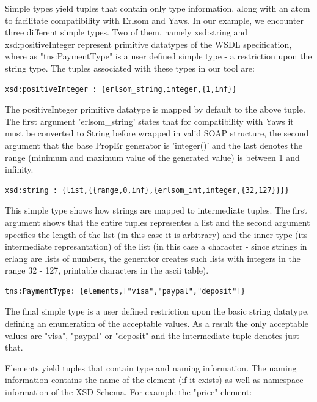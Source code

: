 \documentclass[submission,copyright,a4]{eptcs}
\begin{document}
Simple types yield tuples that contain only type information, along with an atom to facilitate compatibility with Erlsom and Yaws. In our example, we encounter three different simple types. Two of them, namely xsd:string and xsd:positiveInteger represent primitive datatypes of the WSDL specification, where as "tns:PaymentType" is a user defined simple type - a restriction upon the string type. The tuples associated with these types in our tool are:

\begin{lstlisting}
xsd:positiveInteger : {erlsom_string,integer,{1,inf}}
\end{lstlisting}

The positiveInteger primitive datatype is mapped by default to the above tuple. The first argument 'erlsom\_string' states that for compatibility with Yaws it must be converted to String before wrapped in valid SOAP structure, the second argument that the base PropEr generator is 'integer()' and the last denotes the range (minimum and maximum value of the generated value) is between 1 and infinity. 

\begin{lstlisting}
xsd:string : {list,{{range,0,inf},{erlsom_int,integer,{32,127}}}}
\end{lstlisting}

This simple type shows how strings are mapped to intermediate tuples. The first argument shows that the entire tuples representes a list and the second argument specifies the length of the list (in this case it is arbitrary) and the inner type (its intermediate represantation) of the list (in this case a character - since strings in erlang are lists of numbers, the generator creates such lists with integers in the range 32 - 127, printable characters in the ascii table).

\begin{lstlisting}
tns:PaymentType: {elements,["visa","paypal","deposit"]}
\end{lstlisting}

The final simple type is a user defined restriction upon the basic string datatype, defining an enumeration of the acceptable values. As a result the only acceptable values are "visa", "paypal" or "deposit" and the intermediate tuple denotes just that.

Elements yield tuples that contain type and naming information. The naming information contains the name of the element (if it exists) as well as namespace information of the XSD Schema. For example the "price" element:
\end{document}
